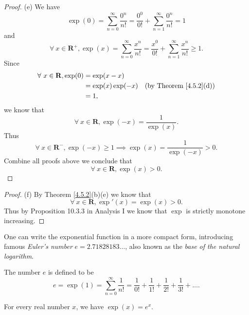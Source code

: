 \begin{proof}{(e)}
    We have
    \[
        \exp(0) = \sum_{n = 0}^\infty \frac{0^n}{n!} = \frac{0^0}{0!} + \sum_{n = 1}^\infty \frac{0^n}{n!} = 1
    \]
    and
    \[
        \forall\ x \in \mathbf{R}^+, \exp(x) = \sum_{n = 0}^\infty \frac{x^n}{n!} = \frac{x^0}{0!} + \sum_{n = 1}^\infty \frac{x^n}{n!} \geq 1.
    \]
    Since
    \begin{align*}
        \forall\ x \in \mathbf{R}, \exp(0) & = \exp(x - x)                                           \\
                                           & = \exp(x) \exp(-x) & \text{(by Theorem \ref{4.5.2}(d))} \\
                                           & = 1,
    \end{align*}
    we know that
    \[
        \forall\ x \in \mathbf{R}, \exp(-x) = \frac{1}{\exp(x)}.
    \]
    Thus
    \[
        \forall\ x \in \mathbf{R}^-, \exp(-x) \geq 1 \implies \exp(x) = \frac{1}{\exp(-x)} > 0.
    \]
    Combine all proofs above we conclude that
    \[
        \forall\ x \in \mathbf{R}, \exp(x) > 0.
    \]
\end{proof}

\begin{proof}{(f)}
    By Theorem \ref{4.5.2}(b)(e) we know that
    \[
        \forall\ x \in \mathbf{R}, \exp'(x) = \exp(x) > 0.
    \]
    Thus by Proposition 10.3.3 in Analysis I we know that \(\exp\) is strictly monotone increasing.
\end{proof}

\begin{note}
    One can write the exponential function in a more compact form, introducing famous \emph{Euler's number} \(e = 2.71828183 \dots\), also known as the \emph{base of the natural logarithm}.
\end{note}

\begin{definition}\label{4.5.3}
    The number \(e\) is defined to be
    \[
        e = \exp(1) = \sum_{n = 0}^\infty \frac{1}{n!} = \frac{1}{0!} + \frac{1}{1!} + \frac{1}{2!} + \frac{1}{3!} + \dots.
    \]
\end{definition}

\begin{proposition}\label{4.5.4}
    For every real number \(x\), we have \(\exp(x) = e^x\).
\end{proposition}

